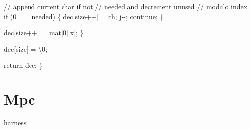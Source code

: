 \documentclass[
  a4paper,
]{scrreprt}
\newenvironment{Shaded}{\begin{snugshade}}{\end{snugshade}}
\newcommand{\CharTok}[1]{\textcolor[rgb]{0.00,0.50,0.00}{#1}}
\newcommand{\CommentTok}[1]{\textcolor[rgb]{0.41,0.41,0.41}{#1}}
\newcommand{\ControlFlowTok}[1]{\textcolor[rgb]{0.85,0.12,0.09}{#1}}
\newcommand{\DecValTok}[1]{\textcolor[rgb]{0.47,0.16,0.63}{#1}}
\newcommand{\NormalTok}[1]{\textcolor[rgb]{0.33,0.33,0.33}{#1}}
\newcommand{\OperatorTok}[1]{\textcolor[rgb]{0.00,0.46,0.62}{#1}}
\newcommand{\SpecialCharTok}[1]{\textcolor[rgb]{0.00,0.46,0.62}{#1}}
\theoremstyle{definition}
\theoremstyle{remark}
\begin{document}
\begin{Shaded}
\begin{Highlighting}[numbers=left,,]
    \CommentTok{// append current char if not}
    \CommentTok{// needed and decrement unused}
    \CommentTok{// modulo index}
    \ControlFlowTok{if} \OperatorTok{(}\DecValTok{0} \OperatorTok{==}\NormalTok{ needed}\OperatorTok{)} \OperatorTok{\{}
\NormalTok{      dec}\OperatorTok{[}\NormalTok{size}\OperatorTok{++]} \OperatorTok{=}\NormalTok{ ch}\OperatorTok{;}
\NormalTok{      j}\OperatorTok{{-}{-};}
      \ControlFlowTok{continue}\OperatorTok{;}
    \OperatorTok{\}}

\NormalTok{    dec}\OperatorTok{[}\NormalTok{size}\OperatorTok{++]} \OperatorTok{=}\NormalTok{ mat}\OperatorTok{[}\DecValTok{0}\OperatorTok{][}\NormalTok{x}\OperatorTok{];}
  \OperatorTok{\}}

\NormalTok{  dec}\OperatorTok{[}\NormalTok{size}\OperatorTok{]} \OperatorTok{=} \CharTok{\textquotesingle{}}\SpecialCharTok{\textbackslash{}0}\CharTok{\textquotesingle{}}\OperatorTok{;}

  \ControlFlowTok{return}\NormalTok{ dec}\OperatorTok{;}
\OperatorTok{\}}
\end{Highlighting}
\end{Shaded}

\section{Mpc}\label{mpc}

harness
\end{document}

